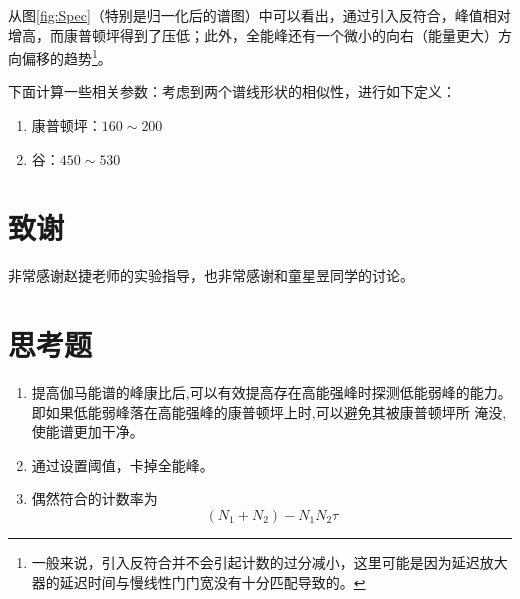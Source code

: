 \documentclass{article}
\begin{document}
    从图\ref{fig:Spec}（特别是归一化后的谱图）中可以看出，通过引入反符合，峰值相对增高，而康普顿坪得到了压低；此外，全能峰还有一个微小的向右（能量更大）方向偏移的趋势\footnote{一般来说，引入反符合并不会引起计数的过分减小，这里可能是因为延迟放大器的延迟时间与慢线性门门宽没有十分匹配导致的。}。

下面计算一些相关参数：考虑到两个谱线形状的相似性，进行如下定义：
\begin{enumerate}
    \item 康普顿坪：$160\sim 200$
    \item 谷：$450\sim 530$
\end{enumerate}


\section{致谢}
    非常感谢赵捷老师的实验指导，也非常感谢和童星昱同学的讨论。
    \clearpage
    \appendix
    \appendixpage
    \section{思考题}
    \begin{enumerate}
        \item 提高伽马能谱的峰康比后,可以有效提高存在高能强峰时探测低能弱峰的能力。即如果低能弱峰落在高能强峰的康普顿坪上时,可以避免其被康普顿坪所
        淹没,使能谱更加干净。
        \item 通过设置阈值，卡掉全能峰。
        \item 偶然符合的计数率为
        \begin{equation}
            (N_1+N_2)-N_1N_2\tau
        \end{equation}
    \end{enumerate}
\end{document}
